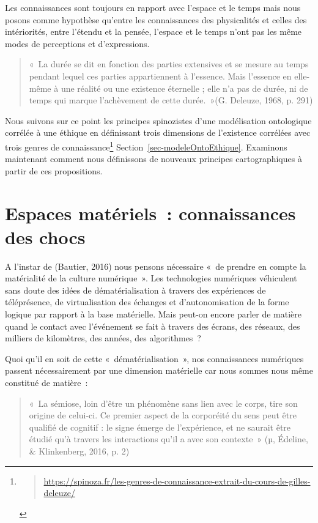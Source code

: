 \documentclass[
  a4paper,
  DIV=11,
  numbers=noendperiod]{scrreprt}
\begin{document}
Les connaissances sont toujours en rapport avec l'espace et le temps
mais nous posons comme hypothèse qu'entre les connaissances des
physicalités et celles des intériorités, entre l'étendu et la pensée,
l'espace et le temps n'ont pas les même modes de perceptions et
d'expressions.

\begin{quote}
«~La durée se dit en fonction des parties extensives et se mesure au
temps pendant lequel ces parties appartiennent à l'essence. Mais
l'essence en elle-même à une réalité ou une existence éternelle ; elle
n'a pas de durée, ni de temps qui marque l'achèvement de cette
durée.~»(G. Deleuze, 1968, p. 291)
\end{quote}

Nous suivons sur ce point les principes spinozistes d'une modélisation
ontologique corrélée à une éthique en définissant trois dimensions de
l'existence corrélées avec trois genres de connaissance\footnote{\begin{quote}
  \url{https://spinoza.fr/les-genres-de-connaissance-extrait-du-cours-de-gilles-deleuze/}
  \end{quote}} Section~\ref{sec-modeleOntoEthique}. Examinons maintenant
comment nous définissons de nouveaux principes cartographiques à partir
de ces propositions.

\section{Espaces matériels~: connaissances des
chocs}\label{sec-espaceMateriels}

A l'instar de (Bautier, 2016) nous pensons nécessaire «~de prendre en
compte la matérialité de la culture numérique~». Les technologies
numériques véhiculent sans doute des idées de dématérialisation à
travers des expériences de téléprésence, de virtualisation des échanges
et d'autonomisation de la forme logique par rapport à la base
matérielle. Mais peut-on encore parler de matière quand le contact avec
l'événement se fait à travers des écrans, des réseaux, des milliers de
kilomètres, des années, des algorithmes~?

Quoi qu'il en soit de cette «~dématérialisation~», nos connaissances
numériques passent nécessairement par une dimension matérielle car nous
sommes nous même constitué de matière~:

\begin{quote}
«~La sémiose, loin d'être un phénomène sans lien avec le corps, tire son
origine de celui-ci. Ce premier aspect de la corporéité du sens peut
être qualifié de cognitif : le signe émerge de l'expérience, et ne
saurait être étudié qu'à travers les interactions qu'il a avec son
contexte~» (µ, Édeline, \& Klinkenberg, 2016, p. 2)
\end{quote}
\end{document}
